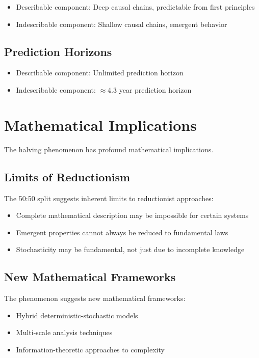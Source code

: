 \documentclass[12pt,a4paper]{report}
\begin{document}
\begin{itemize}
\item Describable component: Deep causal chains, predictable from first principles
\item Indescribable component: Shallow causal chains, emergent behavior
\end{itemize}

\subsection{Prediction Horizons}

\begin{itemize}
\item Describable component: Unlimited prediction horizon
\item Indescribable component: $\approx 4.3$ year prediction horizon
\end{itemize}

\section{Mathematical Implications}

The halving phenomenon has profound mathematical implications.

\subsection{Limits of Reductionism}

The 50:50 split suggests inherent limits to reductionist approaches:
\begin{itemize}
\item Complete mathematical description may be impossible for certain systems
\item Emergent properties cannot always be reduced to fundamental laws
\item Stochasticity may be fundamental, not just due to incomplete knowledge
\end{itemize}

\subsection{New Mathematical Frameworks}

The phenomenon suggests new mathematical frameworks:
\begin{itemize}
\item Hybrid deterministic-stochastic models
\item Multi-scale analysis techniques
\item Information-theoretic approaches to complexity
\end{itemize}
\end{document}
